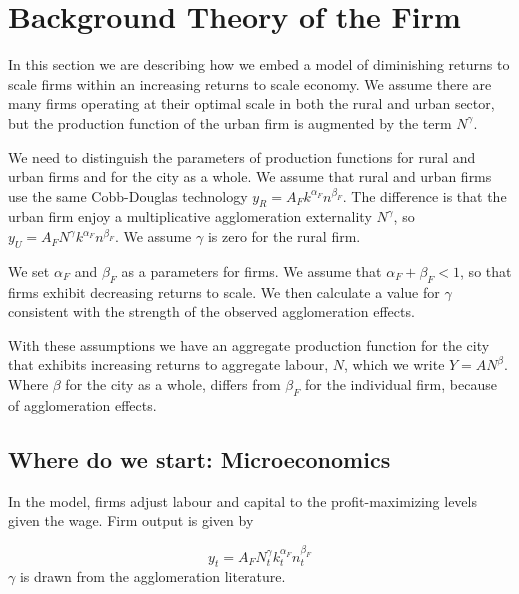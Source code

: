 \chapter{Background Theory of the Firm} \label{appendix-firm-theory}


In this section we are describing how we embed a model of diminishing returns to scale firms within an increasing returns to scale economy. 
We assume there are many firms operating at their optimal scale in both the rural and urban sector, but the production function of the urban firm is augmented by the term $N^\gamma$. 



We need to distinguish the parameters of production functions for rural and urban firms and for the city as a whole. We assume that  rural and  urban firms use the same Cobb-Douglas technology ${y_R}=A_Fk^{\alpha_F}n^{\beta_F}$. The difference is that the urban firm enjoy a  multiplicative agglomeration externality $N^\gamma$, so ${y_U}=A_FN^\gamma  k^{\alpha_F}n^{\beta_F}$. We assume $\gamma$ is zero for the rural firm. 

We set $\alpha_F$ and $\beta_F$ as a parameters for firms. We assume that $\alpha_F+\beta_F<1$, so that firms exhibit decreasing returns to scale.  We then calculate a value for $\gamma$ consistent with the strength of the observed agglomeration effects. 


With these assumptions we have an aggregate production function for the city that exhibits increasing returns to aggregate labour, $N$,  which we write $Y=AN^\beta$. Where $\beta$ for the city as a whole, differs from $\beta_F$ for the individual firm, because of agglomeration effects. 


\section{Where do we start: Microeconomics }
In the model, firms adjust labour and capital to the profit-maximizing levels given the wage. %
Firm output is given by

\begin{equation}
    {y}_t= A_FN_t^\gamma k_t^{\alpha_F}n_t^{\beta_F} \label{eqn-urban-firm-output}
\end{equation}
$\gamma$ is drawn from the agglomeration literature.%

